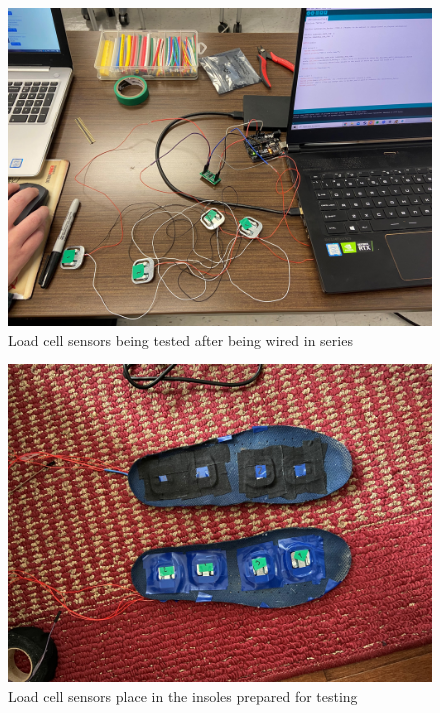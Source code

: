 \documentclass[11pt,letterpaper]{article}
\begin{document}
\begin{figure}[htbp]
\centering
\includegraphics[scale=0.1]{Final_Report/figs/Loadcell_sensors.jpg}
\caption{Load cell sensors being tested after being wired in series}
\label{fig:loadcell}
\end{figure}
\begin{figure}[htbp]
\centering
\includegraphics[scale=0.1]{Final_Report/figs/Loadcell_sensors_sole.jpg}
\caption{Load cell sensors place in the insoles prepared for testing}
\label{fig:loadcell}
\end{figure}
\end{document}
